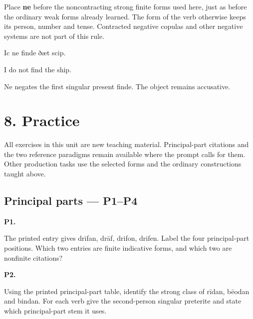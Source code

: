 Place \textbf{ne} before the noncontracting strong finite forms used here, just as before the ordinary weak forms already learned. The form of the verb otherwise keeps its person, number and tense. Contracted negative copulas and other negative systems are not part of this rule.

Ic ne finde ðæt scip.

I do not find the ship.

Ne negates the first singular present finde. The object remains accusative.

\section*{8. Practice}

All exercises in this unit are new teaching material. Principal-part citations and the two reference paradigms remain available where the prompt calls for them. Other production tasks use the selected forms and the ordinary constructions taught above.

\subsection*{Principal parts — P1–P4}

\par\begin{minipage}{\linewidth}\raggedright
\textbf{P1.}

The printed entry gives drīfan, drāf, drifon, drifen. Label the four principal-part positions. Which two entries are finite indicative forms, and which two are nonfinite citations?

\end{minipage}\par\addvspace{4pt}

\par\begin{minipage}{\linewidth}\raggedright
\textbf{P2.}

Using the printed principal-part table, identify the strong class of rīdan, bēodan and bindan. For each verb give the second-person singular preterite and state which principal-part stem it uses.

\end{minipage}\par\addvspace{4pt}

